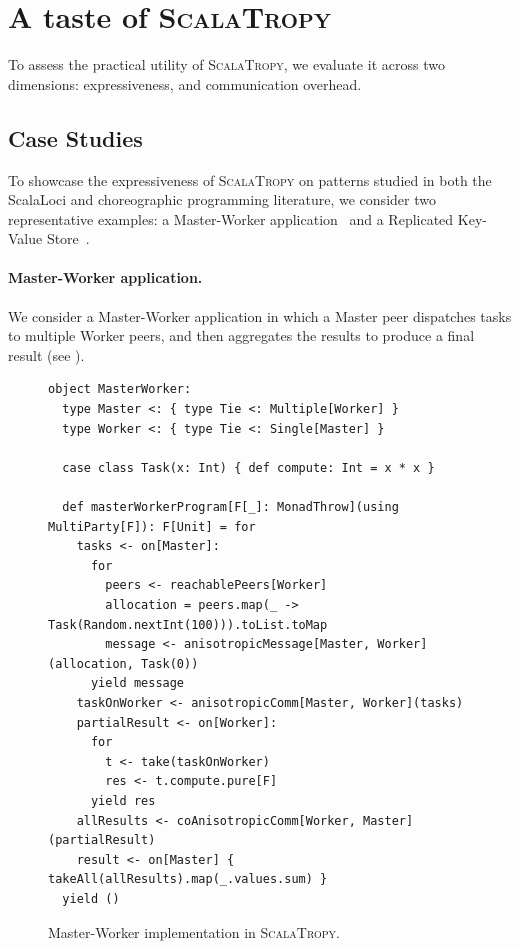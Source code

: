 \documentclass[runningheads]{llncs}
\newcommand{\ourLang}{\textsc{ScalaTropy}}
\newcommand{\diff}[1]{{#1}}
\begin{document}
\section{A taste of \ourLang{}}\label{sec:evaluation}

To assess the practical utility of \ourLang{}, we evaluate it across two dimensions: expressiveness, and communication overhead.

\subsection{Case Studies}

To showcase the expressiveness of \ourLang{} \diff{on} patterns \diff{studied in} both \diff{the ScalaLoci and choreographic programming literature},
we consider two representative examples: a Master-Worker application~\cite{DBLP:journals/pacmpl/WeisenburgerKS18} and a Replicated Key-Value Store~\cite{10.1145/3607849}.

\paragraph{Master-Worker application.}
We consider a Master-Worker application in which a Master peer dispatches tasks to multiple Worker peers,
and then aggregates the results to produce a final result (see ).
%
\begin{figure}[t]
\begin{lstlisting}[style=scala3]
object MasterWorker:
  type Master <: { type Tie <: Multiple[Worker] }
  type Worker <: { type Tie <: Single[Master] }

  case class Task(x: Int) { def compute: Int = x * x }

  def masterWorkerProgram[F[_]: MonadThrow](using MultiParty[F]): F[Unit] = for
    tasks <- on[Master]:
      for
        peers <- reachablePeers[Worker]
        allocation = peers.map(_ -> Task(Random.nextInt(100))).toList.toMap
        message <- anisotropicMessage[Master, Worker](allocation, Task(0))
      yield message
    taskOnWorker <- anisotropicComm[Master, Worker](tasks)
    partialResult <- on[Worker]:
      for
        t <- take(taskOnWorker)
        res <- t.compute.pure[F]
      yield res
    allResults <- coAnisotropicComm[Worker, Master](partialResult)
    result <- on[Master] { takeAll(allResults).map(_.values.sum) }
  yield ()
\end{lstlisting}
\caption{Master-Worker implementation in \ourLang{}.}
\label{fig:master-worker}
\end{figure}
\end{document}
